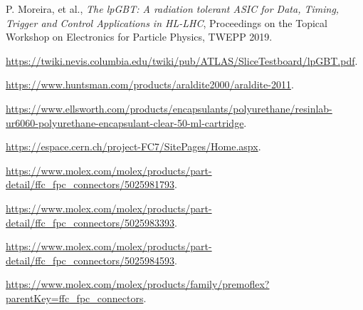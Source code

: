 \documentclass[a4paper,11pt]{article}
\begin{document}
\begin{thebibliography}{99}
P. Moreira, et al., \emph{The lpGBT: A radiation tolerant ASIC for Data, Timing, Trigger and Control Applications in HL-LHC},
Proceedings on the Topical Workshop on Electronics for Particle Physics, TWEPP 2019.


\url{https://twiki.nevis.columbia.edu/twiki/pub/ATLAS/SliceTestboard/lpGBT.pdf}.


\url{https://www.huntsman.com/products/araldite2000/araldite-2011}.


\url{https://www.ellsworth.com/products/encapsulants/polyurethane/resinlab-ur6060-polyurethane-encapsulant-clear-50-ml-cartridge}.

\url{https://espace.cern.ch/project-FC7/SitePages/Home.aspx}.

%
%
%
%

\url{https://www.molex.com/molex/products/part-detail/ffc_fpc_connectors/5025981793}.

\url{https://www.molex.com/molex/products/part-detail/ffc_fpc_connectors/5025983393}.

\url{https://www.molex.com/molex/products/part-detail/ffc_fpc_connectors/5025984593}.

\url{https://www.molex.com/molex/products/family/premoflex?parentKey=ffc_fpc_connectors}.

\end{thebibliography}
\end{document}
